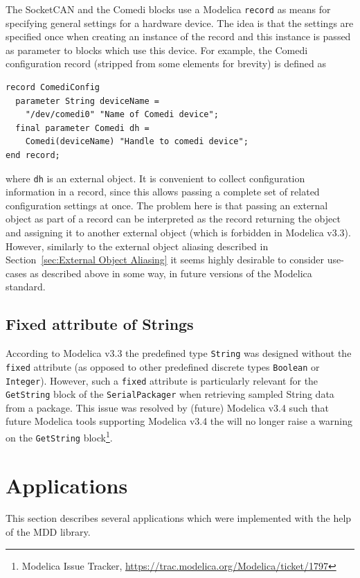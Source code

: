 \documentclass{resources/modelica}
\newcommand{\modelica}[1]{\lstinline[language=modelica]|#1|}
\begin{document}
The SocketCAN and the Comedi blocks use a Modelica \modelica{record} as means
for specifying general settings for a hardware device. The idea is that the
settings are specified once when creating an instance of the record and
this instance is passed as parameter to blocks which use this device. For
example, the Comedi configuration record (stripped from some elements for brevity) is defined
as
\begin{lstlisting}[language=modelica]
record ComediConfig
  parameter String deviceName =
    "/dev/comedi0" "Name of Comedi device";
  final parameter Comedi dh =
    Comedi(deviceName) "Handle to comedi device";
end record;
\end{lstlisting}
where \modelica{dh} is an external object. It is convenient to collect
configuration information in a record, since this allows passing a complete set
of related configuration settings at once. The problem here is that passing an
external object as part of a record can be interpreted as the record returning
the object and assigning it to another external object (which is forbidden in
Modelica v3.3). However, similarly to the external object aliasing described in
Section~\ref{sec:External Object Aliasing} it seems highly desirable to consider
use-cases as described above in some way,  in future versions of the Modelica
standard.

\subsection{Fixed attribute of Strings}

According to Modelica v3.3 the predefined type \mbox{\modelica{String}} was designed without the \modelica{fixed} attribute (as opposed to other predefined discrete types \modelica{Boolean} or \modelica{Integer}). However, such a \modelica{fixed} attribute is particularly relevant for the \modelica{GetString} block of the \modelica{SerialPackager} when retrieving sampled String data from a package. This issue was resolved by (future) Modelica v3.4 such that future Modelica tools supporting  Modelica v3.4  the will no longer raise a warning on the \modelica{GetString} block\footnote{Modelica Issue Tracker, \url{https://trac.modelica.org/Modelica/ticket/1797}}.


\section{Applications}
\label{sec:Applications}

This section describes several applications which were implemented with the
help of the MDD library.
\end{document}
